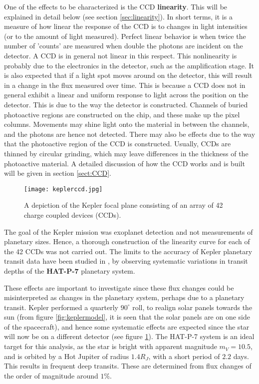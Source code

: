 \documentclass[../main.tex]{subfiles}
\begin{document}
	One of the effects to be characterized is the CCD \textbf{linearity}. This will be explained in detail below (see section \ref{sec:linearity}). In short terms, it is a measure of how linear the response of the CCD is to changes in light intensities (or to the amount of light measured). Perfect linear behavior is when twice the number of 'counts' are measured when double the photons are incident on the detector. A CCD is in general not linear in this respect. This nonlinearity is probably due to the electronics in the detector, such as the amplification stage. It is also expected that if a light spot moves around on the detector, this will result in a change in the flux measured over time. This is because a CCD does not in general exhibit a linear and uniform response to light across the position on the detector. This is due to the way the detector is constructed. Channels of buried photoactive regions are constructed on the chip, and these make up the pixel columns. Movements may shine light onto the material in between the channels, and the photons are hence not detected. There may also be effects due to the way that the photoactive region of the CCD is constructed. Usually, CCDs are thinned by circular grinding, which may leave differences in the thickness of the photoactive material. A detailed discussion of how the CCD works and is built will be given in section \ref{sect:CCD}.
	
	\begin{figure}
		\centering			
		\texttt{[image: keplerccd.jpg]}
		\caption{A depiction \cite{keplerfocalplaneimage} of the Kepler focal plane consisting of an array of 42 charge coupled devices (CCDs).}
		\label{fig:keplerccd}
	\end{figure}
	
	The goal of the Kepler mission was exoplanet detection and not measurements of planetary sizes. Hence, a thorough construction of the linearity curve for each of the 42 CCDs was not carried out. The limits to the accuracy of Kepler planetary transit data have been studied in \cite{hatp7}, by observing systematic variations in transit depths of the \textbf{HAT-P-7} planetary system. 
	
	These effects are important to investigate since these flux changes could be misinterpreted as changes in the planetary system, perhaps due to a planetary transit. Kepler performed a quarterly $90^\circ$ roll, to realign solar panels towards the sun (from figure \ref{fig:keplermodel}, it is seen that the solar panels are on one side of the spacecraft), and hence some systematic effects are expected since the star will now be on a different detector (see figure \ref{fig:keplerccd}). The HAT-P-7 system is an ideal target for this analysis, as the star is bright with apparent magnitude $m_V = 10.5$\cite{hatp7}, and is orbited by a Hot Jupiter of radius $1.4 R_J$, with a short period of $2.2$ days. This results in frequent deep transits. These are determined from flux changes of the order of magnitude around $1\%$. 
	
\end{document}
